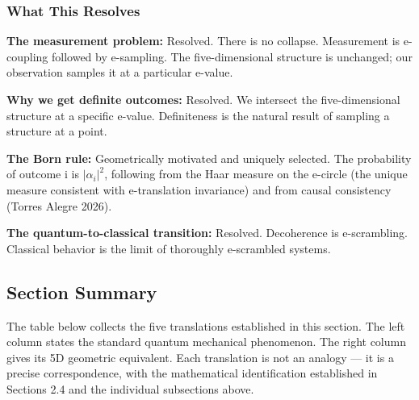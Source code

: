 \documentclass[aps,prd,preprint,superscriptaddress,longbibliography,floatfix]{revtex4-2}
\theoremstyle{remark}
\begin{document}
\subsubsection{What This Resolves}

\textbf{The measurement problem:} Resolved. There is no collapse. Measurement is e-coupling followed by e-sampling. The five-dimensional structure is unchanged; our observation samples it at a particular e-value.

\textbf{Why we get definite outcomes:} Resolved. We intersect the five-dimensional structure at a specific e-value. Definiteness is the natural result of sampling a structure at a point.

\textbf{The Born rule:} Geometrically motivated and uniquely selected. The probability of outcome i is $|\alpha_{i}|^{2}$, following from the Haar measure on the e-circle (the unique measure consistent with e-translation invariance) and from causal consistency (Torres Alegre 2026).

\textbf{The quantum-to-classical transition:} Resolved. Decoherence is e-scrambling. Classical behavior is the limit of thoroughly e-scrambled systems.



\subsection{Section Summary}

The table below collects the five translations established in this section. The left column states the standard quantum mechanical phenomenon. The right column gives its 5D geometric equivalent. Each translation is not an analogy --- it is a precise correspondence, with the mathematical identification established in Sections 2.4 and the individual subsections above.
\end{document}
